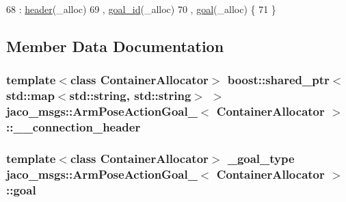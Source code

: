 \begin{DoxyCode}
68     : \hyperlink{structjaco__msgs_1_1ArmPoseActionGoal___afb64a7a2cf0f0b1238fb648892309b73}{header}(\_alloc)
69     , \hyperlink{structjaco__msgs_1_1ArmPoseActionGoal___a31706511987f26a7957034725c70f0d0}{goal\_id}(\_alloc)
70     , \hyperlink{structjaco__msgs_1_1ArmPoseActionGoal___ab45ae30e9322a91a845c852749425c97}{goal}(\_alloc)  \{
71     \}
\end{DoxyCode}


\subsection{Member Data Documentation}
\subsubsection[{\texorpdfstring{\+\_\+\+\_\+connection\+\_\+header}{__connection_header}}]{\setlength{\rightskip}{0pt plus 5cm}template$<$class Container\+Allocator$>$ boost\+::shared\+\_\+ptr$<$std\+::map$<$std\+::string, std\+::string$>$ $>$ {\bf jaco\+\_\+msgs\+::\+Arm\+Pose\+Action\+Goal\+\_\+}$<$ Container\+Allocator $>$\+::\+\_\+\+\_\+connection\+\_\+header}\hypertarget{structjaco__msgs_1_1ArmPoseActionGoal___aee4d1c5a0ed60be0b6c3827941672d44}{}\label{structjaco__msgs_1_1ArmPoseActionGoal___aee4d1c5a0ed60be0b6c3827941672d44}
\subsubsection[{\texorpdfstring{goal}{goal}}]{\setlength{\rightskip}{0pt plus 5cm}template$<$class Container\+Allocator$>$ {\bf \+\_\+goal\+\_\+type} {\bf jaco\+\_\+msgs\+::\+Arm\+Pose\+Action\+Goal\+\_\+}$<$ Container\+Allocator $>$\+::goal}\hypertarget{structjaco__msgs_1_1ArmPoseActionGoal___ab45ae30e9322a91a845c852749425c97}{}\label{structjaco__msgs_1_1ArmPoseActionGoal___ab45ae30e9322a91a845c852749425c97}

